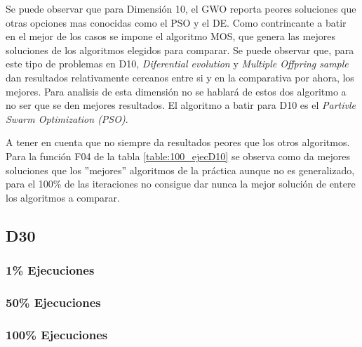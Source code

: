 \documentclass[a4paper, 12.5pt]{report}
\begin{document}
Se puede observar que para Dimensión 10, el GWO reporta peores soluciones que otras opciones mas conocidas como el PSO y el DE. Como contrincante a batir en el mejor de los casos se impone el algoritmo MOS, que genera las mejores soluciones de los algoritmos elegidos para comparar. Se puede observar que, para este tipo de problemas en D10, \textit{Diferential evolution} y \textit{Multiple Offpring sample} dan resultados relativamente cercanos entre si y en la comparativa por ahora, los mejores. Para analisis de esta dimensión no se hablará de estos dos algoritmo a no ser que se den mejores resultados. El algoritmo a batir para D10 es el \textit{Partivle Swarm Optimization (PSO)}.

A tener en cuenta que no siempre da resultados peores que los otros algoritmos. Para la función F04 de la tabla \ref{table:100_ejecD10} se observa como da mejores soluciones que los ''mejores'' algoritmos de la práctica aunque no es generalizado, para el 100\% de las iteraciones no consigue dar nunca la mejor solución de entere los algoritmos a comparar.




\subsection{D30}

\subsubsection*{1\% Ejecuciones}


\subsubsection*{50\% Ejecuciones}


\subsubsection*{100\% Ejecuciones}

\end{document}
